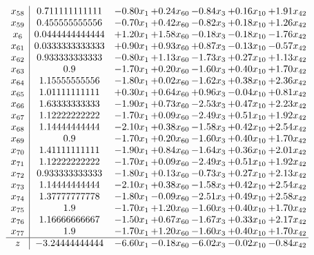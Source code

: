 \documentclass[8pt]{article}
\begin{document}
\[\begin{array}{c| c c@{\hskip 2pt} c@{\hskip 2pt} c@{\hskip 2pt} c@{\hskip 2pt} c@{\hskip 2pt} }
 x_{58}   &  0.711111111111 & -0.80 x_{1} & +  0.24 x_{60} & -0.84 x_{3} & +  0.16 x_{10} & +  1.91 x_{42}\\
 x_{59}   &  0.455555555556 & -0.70 x_{1} & +  0.42 x_{60} & -0.82 x_{3} & +  0.18 x_{10} & +  1.26 x_{42}\\
 x_{6}   &  0.0444444444444 & +  1.20 x_{1} & +  1.58 x_{60} & -0.18 x_{3} & -0.18 x_{10} & -1.76 x_{42}\\
 x_{61}   &  0.0333333333333 & +  0.90 x_{1} & +  0.93 x_{60} & +  0.87 x_{3} & -0.13 x_{10} & -0.57 x_{42}\\
 x_{62}   &  0.933333333333 & -0.80 x_{1} & +  1.13 x_{60} & -1.73 x_{3} & +  0.27 x_{10} & +  1.13 x_{42}\\
 x_{63}   &  0.9 & -1.70 x_{1} & +  0.20 x_{60} & -1.60 x_{3} & +  0.40 x_{10} & +  1.70 x_{42}\\
 x_{64}   &  1.15555555556 & -1.80 x_{1} & +  0.02 x_{60} & -1.62 x_{3} & +  0.38 x_{10} & +  2.36 x_{42}\\
 x_{65}   &  1.01111111111 & +  0.30 x_{1} & +  0.64 x_{60} & +  0.96 x_{3} & -0.04 x_{10} & +  0.81 x_{42}\\
 x_{66}   &  1.63333333333 & -1.90 x_{1} & +  0.73 x_{60} & -2.53 x_{3} & +  0.47 x_{10} & +  2.23 x_{42}\\
 x_{67}   &  1.12222222222 & -1.70 x_{1} & +  0.09 x_{60} & -2.49 x_{3} & +  0.51 x_{10} & +  1.92 x_{42}\\
 x_{68}   &  1.14444444444 & -2.10 x_{1} & +  0.38 x_{60} & -1.58 x_{3} & +  0.42 x_{10} & +  2.54 x_{42}\\
 x_{69}   &  0.9 & -1.70 x_{1} & +  0.20 x_{60} & -1.60 x_{3} & +  0.40 x_{10} & +  1.70 x_{42}\\
 x_{70}   &  1.41111111111 & -1.90 x_{1} & +  0.84 x_{60} & -1.64 x_{3} & +  0.36 x_{10} & +  2.01 x_{42}\\
 x_{71}   &  1.12222222222 & -1.70 x_{1} & +  0.09 x_{60} & -2.49 x_{3} & +  0.51 x_{10} & +  1.92 x_{42}\\
 x_{72}   &  0.933333333333 & -1.80 x_{1} & +  0.13 x_{60} & -0.73 x_{3} & +  0.27 x_{10} & +  2.13 x_{42}\\
 x_{73}   &  1.14444444444 & -2.10 x_{1} & +  0.38 x_{60} & -1.58 x_{3} & +  0.42 x_{10} & +  2.54 x_{42}\\
 x_{74}   &  1.37777777778 & -1.80 x_{1} & -0.09 x_{60} & -2.51 x_{3} & +  0.49 x_{10} & +  2.58 x_{42}\\
 x_{75}   &  1.9 & -1.70 x_{1} & +  1.20 x_{60} & -1.60 x_{3} & +  0.40 x_{10} & +  1.70 x_{42}\\
 x_{76}   &  1.16666666667 & -1.50 x_{1} & +  0.67 x_{60} & -1.67 x_{3} & +  0.33 x_{10} & +  2.17 x_{42}\\
 x_{77}   &  1.9 & -1.70 x_{1} & +  1.20 x_{60} & -1.60 x_{3} & +  0.40 x_{10} & +  1.70 x_{42}\\
\hline
z    &  -3.24444444444 & -6.60 x_{1} & -0.18 x_{60} & -6.02 x_{3} & -0.02 x_{10} & -0.84 x_{42}\\
\end{array}\]
\end{document}
